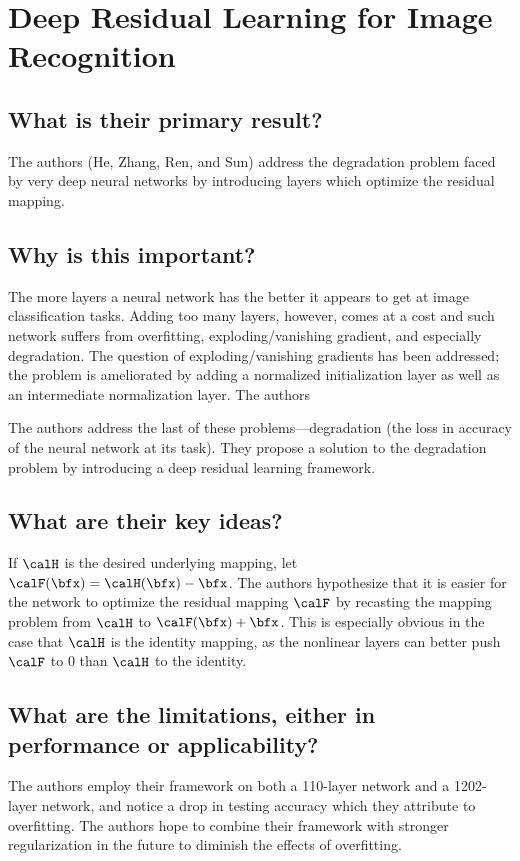 \section{Deep Residual Learning for Image Recognition}

\subsection*{What is their primary result?}
The authors (He, Zhang, Ren, and Sun) address the degradation problem faced by
very deep neural networks by introducing layers which optimize the residual
mapping.

\subsection*{Why is this important?}
The more layers a neural network has the better it appears to get at image
classification tasks. Adding too many layers, however, comes at a cost and such
network suffers from overfitting, exploding/vanishing gradient, and especially
degradation. The question of exploding/vanishing gradients has been addressed;
the problem is ameliorated by adding a normalized initialization layer as well
as an intermediate normalization layer. The authors

The authors address the last of these problems---degradation (the loss in
accuracy of the neural network at its task). They propose a solution to the
degradation problem by introducing a deep residual learning framework.

\subsection*{What are their key ideas?}
If $\calH$ is the desired underlying mapping, let
$\calF(\bfx)=\calH(\bfx)-\bfx$. The authors hypothesize that it is easier for
the network to optimize the residual mapping $\calF$ by recasting the
mapping problem from $\calH$ to $\calF(\bfx)+\bfx$. This is especially obvious
in the case that $\calH$ is the identity mapping, as the nonlinear layers can
better push $\calF$ to $0$ than $\calH$ to the identity.

\subsection*{What are the limitations, either in performance or applicability?}
The authors employ their framework on both a 110-layer network and a 1202-layer
network, and notice a drop in testing accuracy which they attribute to
overfitting. The authors hope to combine their framework with stronger
regularization in the future to diminish the effects of overfitting.

